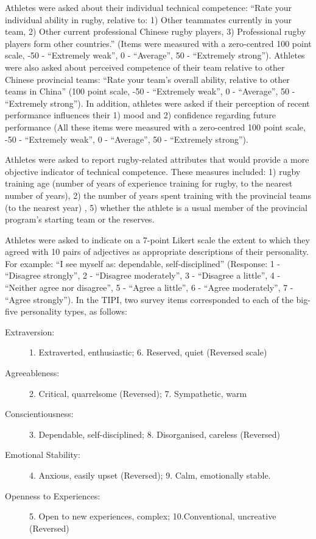 Athletes were asked about their individual technical competence: ``Rate your individual ability in rugby, relative to: 1) Other teammates currently in your team, 2) Other current professional Chinese rugby players, 3) Professional rugby players form other countries.'' (Items were measured with a zero-centred 100 point scale, -50 - ``Extremely weak'', 0 - ``Average'', 50 - ``Extremely strong'').  Athletes were also asked about perceived competence of their team relative to other Chinese provincial teams: ``Rate your team's overall ability, relative to other teams in China'' (100 point scale, -50 - ``Extremely weak'', 0 - ``Average'', 50 - ``Extremely strong'').  In addition, athletes were asked if their perception of recent performance influences their 1) mood and 2) confidence regarding future performance (All these items were measured with a zero-centred 100 point scale, -50 - ``Extremely weak'', 0 - ``Average'', 50 - ``Extremely strong'').

Athletes were asked to report rugby-related attributes that would provide a more objective indicator of technical competence. These measures included: 1) rugby training age (number of years of experience training for rugby, to the nearest number of years), 2) the number of years spent training with the provincial teams (to the nearest year) , 5) whether the athlete is a usual member of the provincial program's starting team or the reserves.


Athletes were asked to indicate on a 7-point Likert scale the extent to which they agreed with 10 pairs of adjectives as appropriate descriptions of their personality. For example: ``I see myself as: dependable, self-disciplined'' (Response: 1 - ``Disagree strongly'', 2 - ``Disagree moderately'',  3 - ``Disagree a little'', 4 - ``Neither agree nor disagree'', 5 - ``Agree a little'', 6 - ``Agree moderately'', 7 - ``Agree strongly''). In the TIPI, two survey items corresponded to each of the big-five personality types, as follows:

\begin{description}
\item [Extraversion:] 1. Extraverted, enthusiastic; 6. Reserved, quiet (Reversed scale)
\item [Agreeableness:] 2. Critical, quarrelsome (Reversed); 7. Sympathetic, warm
\item [Conscientiousness:] 3. Dependable, self-disciplined; 8. Disorganised, careless (Reversed)
\item [Emotional Stability:] 4. Anxious, easily upset (Reversed); 9. Calm, emotionally stable.
\item [Openness to Experiences:] 5. Open to new experiences, complex; 10.Conventional, uncreative (Reversed)
\end{description}


